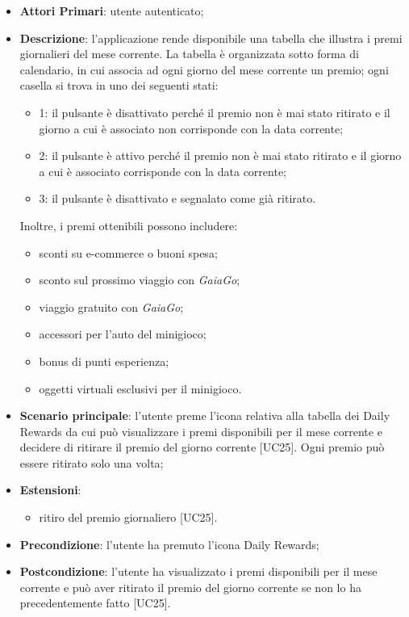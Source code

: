 \begin{itemize}
	\item \textbf{Attori Primari}: utente autenticato;
	\item \textbf{Descrizione}: l'applicazione rende disponibile una tabella che illustra i premi giornalieri del mese corrente. La tabella è organizzata sotto forma di calendario, in cui associa ad ogni giorno del mese corrente un premio;
	ogni casella si trova in uno dei seguenti stati:
	\begin{itemize}
		\item 1: il pulsante è disattivato perché il premio non è mai stato ritirato e il giorno a cui è associato non corrisponde con la data corrente;
		\item 2: il pulsante è attivo perché il premio non è mai stato ritirato e il giorno a cui è associato corrisponde con la data corrente;
		\item 3: il pulsante è disattivato e segnalato come già ritirato. 
	\end{itemize} 
	Inoltre, i premi ottenibili possono includere:
	\begin{itemize}
		\item sconti su e-commerce o buoni spesa;
		\item sconto sul prossimo viaggio con \textit{GaiaGo};
		\item viaggio gratuito con \textit{GaiaGo};
		\item accessori per l'auto del minigioco;
		\item bonus di punti esperienza;
		\item oggetti virtuali esclusivi per il minigioco.
	\end{itemize}
	\item \textbf{Scenario principale}: l'utente preme l'icona relativa alla tabella dei Daily Rewards da cui può visualizzare i premi disponibili per il mese corrente e decidere di ritirare il premio del giorno corrente [UC25].
	Ogni premio può essere ritirato solo una volta;
	\item \textbf{Estensioni}: 
		\begin{itemize}
			\item ritiro del premio giornaliero [UC25].
		\end{itemize}
	\item \textbf{Precondizione}: l'utente ha premuto l'icona Daily Rewards;
	\item \textbf{Postcondizione}: l'utente ha visualizzato i premi disponibili per il mese corrente e può aver ritirato il premio del giorno corrente se non lo ha precedentemente fatto [UC25]. 
\end{itemize} 

